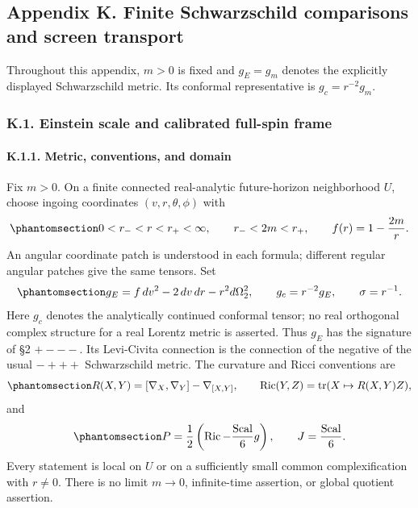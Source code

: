 \documentclass[
  english,
  11pt,
  reqno]{amsart}
\begin{document}
\protect{}\label{app:sh-schwarzschild}

\subsection{Appendix K. Finite Schwarzschild comparisons and screen
transport}\label{appendix-k.-finite-schwarzschild-comparisons-and-screen-transport}

Throughout this appendix, \(m>0\) is fixed and \(g_E=g_m\) denotes the
explicitly displayed Schwarzschild metric. Its conformal representative
is \(g_c=r^{-2}g_m\).

\protect{}\label{sec:sh-integrated-scale}

\subsubsection{K.1. Einstein scale and calibrated full-spin
frame}\label{k.1.-einstein-scale-and-calibrated-full-spin-frame}

\protect{}\label{sec:sh-scale-1}

\paragraph{K.1.1. Metric, conventions, and
domain}\label{k.1.1.-metric-conventions-and-domain}

Fix \(m>0\). On a finite connected real-analytic future-horizon
neighborhood \(U\), choose ingoing coordinates \((v,r,\theta,\phi)\)
with \begin{equation}\protect\phantomsection\label{eq:sh-scale-a1}{
0<r_-<r<r_+<\infty,\qquad r_-<2m<r_+,
\qquad f(r)=1-\frac{2m}{r}.
}\end{equation} An angular coordinate patch is understood in each
formula; different regular angular patches give the same tensors. Set
\begin{equation}\protect\phantomsection\label{eq:sh-scale-a2}{
g_E=f\,dv^2-2\,dv\,dr-r^2d\Omega_2^2,
\qquad g_c=r^{-2}g_E,
\qquad \sigma=r^{-1}.
}\end{equation} Here \(g_c\) denotes the analytically continued
conformal tensor; no real orthogonal complex structure for a real
Lorentz metric is asserted. Thus \(g_E\) has the signature of §2
\(+---\). Its Levi-Civita connection is the connection of the negative
of the usual \(-+++\) Schwarzschild metric. The curvature and Ricci
conventions are
\begin{equation}\protect\phantomsection\label{eq:sh-scale-a3}{
R(X,Y)=[\nabla_X,\nabla_Y]-\nabla_{[X,Y]},\qquad
\operatorname{Ric}(Y,Z)=\operatorname{tr}(X\mapsto R(X,Y)Z),
}\end{equation} and
\begin{equation}\protect\phantomsection\label{eq:sh-scale-a4}{
P=\frac12\left(\operatorname{Ric}-\frac{\operatorname{Scal}}6g\right),
\qquad J=\frac{\operatorname{Scal}}6.
}\end{equation} Every statement is local on \(U\) or on a sufficiently
small common complexification with \(r\ne0\). There is no limit
\(m\to0\), infinite-time assertion, or global quotient assertion.
\end{document}
